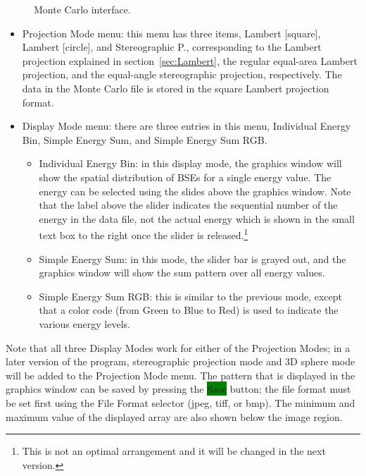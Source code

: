 \documentclass[DIV=calc, paper=letter, fontsize=11pt]{scrartcl}	 %
\newcommand{\button}[1]{\colorbox{green}{\textsf{#1}} button}
\begin{document}
\begin{figure}[t]
\leavevmode\centering
\epsfxsize=3in
\caption{\label{fig:MCdisplay}Monte Carlo interface.}
\end{figure}

\begin{itemize}
	\item \textsf{Projection Mode} menu:  this menu has three items, \textsf{Lambert [square]}, \textsf{Lambert [circle]}, and \textsf{Stereographic P.}, corresponding to the 
	Lambert projection explained in section~\ref{sec:Lambert}, the regular equal-area Lambert projection, and the equal-angle stereographic projection, respectively.  The data in the Monte Carlo
	file is stored in the square Lambert projection format.
	\item \textsf{Display Mode} menu: there are three entries in this menu, \textsf{Individual Energy Bin}, \textsf{Simple Energy Sum}, and \textsf{Simple Energy Sum RGB}.
	\begin{itemize}
		\item \textsf{Individual Energy Bin}: in this display mode, the graphics window will show the spatial distribution of BSEs for a single energy value.  The energy
		can be selected using the slides above the graphics window.  Note that the label above the slider indicates the sequential number of the energy in the 
		data file, not the actual energy which is shown in the small text box to the right once the slider is released.\footnote{This is not an optimal arrangement and 
		it will be changed in the next version.}
		\item \textsf{Simple Energy Sum}: in this mode, the slider bar is grayed out, and the graphics window will show the sum pattern over all energy values.  
		\item \textsf{Simple Energy Sum RGB}: this is similar to the previous mode, except that a color code (from Green to Blue to Red) 
		is used to indicate the various energy levels.
	\end{itemize}
\end{itemize}
Note that all three \textsf{Display Mode}s work for either of the \textsf{Projection Modes}; in a later version of the program, stereographic projection mode and 
3D sphere mode will be added to the \textsf{Projection Mode} menu.  The pattern that is displayed in the graphics window can be saved by pressing the 
\button{Save}; the file format must be set first using the File Format selector (jpeg, tiff, or bmp).  The minimum and maximum value of the displayed array
are also shown below the image region.
\end{document}
